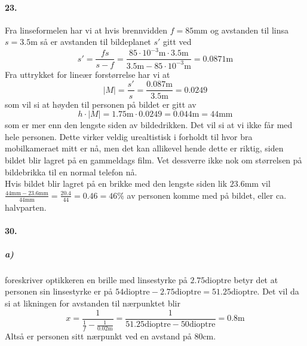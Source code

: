 \documentclass[11pt, A4paper,norsk]{article}
\begin{document}
		\paragraph{23.}
			\begin{flushleft}
Fra linseformelen har vi at hvis brennvidden $f = 85 \text{mm}$ og avstanden til linsa $s = 3.5 \text{m}$ så er avstanden til bildeplanet $s'$ gitt ved
$$s' = \frac{fs}{s - f} = \frac{85 \cdot 10^{-3} \text{m} \cdot 3.5 \text{m}}{3.5 \text{m} - 85 \cdot 10^{-3} \text{m}} = 0.0871 \text{m}$$
Fra uttrykket for lineær forstørrelse har vi at
$$|M| = \frac{s'}{s} = \frac{0.087 \text{m}}{3.5 \text{m}} = 0.0249$$
som vil si at høyden til personen på bildet er gitt av
$$h \cdot |M| = 1.75 \text{m} \cdot 0.0249 = 0.044 \text{m} = 44 \text{mm}$$
som er mer enn den lengste siden av bildedrikken. Det vil si at vi ikke får med hele personen. Dette virker veldig urealtistisk i forholdt til hvor bra mobilkameraet mitt er nå, men det kan allikevel hende dette er riktig, siden bildet blir lagret på en gammeldags film. Vet dessverre ikke nok om størrelsen på bildebrikka til en normal telefon nå. \\

Hvis bildet blir lagret på en brikke med den lengste siden lik $23.6 \text{mm}$ vil $\frac{44 \text{mm} - 23.6 \text{mm}}{44 \text{mm}} = \frac{20.4}{44} = 0.46 = 46 \%$ av personen komme med på bildet, eller ca. halvparten.
			\end{flushleft}









		\paragraph{30.}
			\subparagraph{a)}
				\begin{flushleft}
foreskriver optikkeren en brille med linsestyrke på $2.75 \text{dioptre}$  betyr det at personen sin linsestyrke er på $54 \text{dioptre} - 2.75 \text{dioptre} = 51.25 \text{dioptre}$. Det vil da si at likningen for avstanden til nærpunktet blir
$$x = \frac{1}{\frac{1}{f} - \frac{1}{0.02 \text{m}}} = \frac{1}{51.25 \text{dioptre} - 50 \text{dioptre}} = 0.8 \text{m}$$
Altså er personen sitt nærpunkt ved en avstand på $80 \text{cm}$.
				\end{flushleft}
\end{document}

